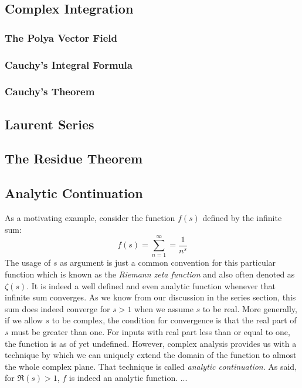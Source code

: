 \subsection{Complex Integration}

\subsubsection{The Polya Vector Field}

\subsubsection{Cauchy's Integral Formula}

\subsubsection{Cauchy's Theorem}


\subsection{Laurent Series}

\subsection{The Residue Theorem}

\subsection{Analytic Continuation}
As a motivating example, consider the function $f(s)$ defined by the infinite sum:
\begin{equation}
f(s) = \sum_{n=1}^{\infty} = \frac{1}{n^s}
\end{equation}
The usage of $s$ as argument is just a common convention for this particular function which is known as the \emph{Riemann zeta function} and also often denoted as $\zeta (s)$. It is indeed a well defined and even analytic function whenever that infinite sum converges. As we know from our discussion in the series section, this sum does indeed converge for $s > 1$ when we assume $s$ to be real. More generally, if we allow $s$ to be complex, the condition for convergence is that the real part of $s$ must be greater than one. For inputs with real part less than or equal to one, the function is as of yet undefined. However, complex analysis provides us with a technique by which we can uniquely extend the domain of the function to almost the whole complex plane. That technique is called \emph{analytic continuation}. As said, for $\Re(s) > 1$, $f$ is indeed an analytic function. ...


